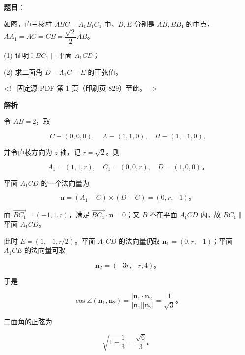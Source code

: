 \begin{answer}

\textbf{题目}：

如图，直三棱柱 $ABC-A_1B_1C_1$ 中，$D,E$ 分别是 $AB,BB_1$ 的中点，$AA_1=AC=CB=\dfrac{\sqrt2}{2}AB$。
\nopagebreak[4]
\begin{center}\end{center}
\nopagebreak[4]
(1) 证明：$BC_1\parallel$ 平面 $A_1CD$；

(2) 求二面角 $D-A_1C-E$ 的正弦值。

<!-- 固定源 PDF 第 1 页（印刷页 829）至此。 -->

\textbf{解析}


令 $AB=2$，取

\nopagebreak[4]
\[C=(0,0,0),\quad A=(1,1,0),\quad B=(1,-1,0),\]

并令直棱方向为 $z$ 轴，记 $r=\sqrt2$。则

\nopagebreak[4]
\[A_1=(1,1,r),\quad C_1=(0,0,r),\quad D=(1,0,0)\text{。}\]

平面 $A_1CD$ 的一个法向量为

\nopagebreak[4]
\[\boldsymbol n=(A_1-C)\times(D-C)=(0,r,-1)\text{。}\]

而 $\overrightarrow{BC_1}=(-1,1,r)$，满足 $\overrightarrow{BC_1}\cdot\boldsymbol n=0$；又 $B$ 不在平面 $A_1CD$ 内，故 $BC_1\parallel$ 平面 $A_1CD$。


此时 $E=(1,-1,r/2)$。平面 $A_1CD$ 的法向量仍取 $\boldsymbol n_1=(0,r,-1)$；平面 $A_1CE$ 的法向量可取

\nopagebreak[4]
\[\boldsymbol n_2=(-3r,-r,4)\text{。}\]

于是

\nopagebreak[4]
\[\cos\angle(\boldsymbol n_1,\boldsymbol n_2)=\frac{|\boldsymbol n_1\cdot\boldsymbol n_2|}{|\boldsymbol n_1||\boldsymbol n_2|}=\frac1{\sqrt3}\text{。}\]

二面角的正弦为

\nopagebreak[4]
\[\sqrt{1-\frac13}=\frac{\sqrt6}{3}\text{。}\]



\end{answer}
